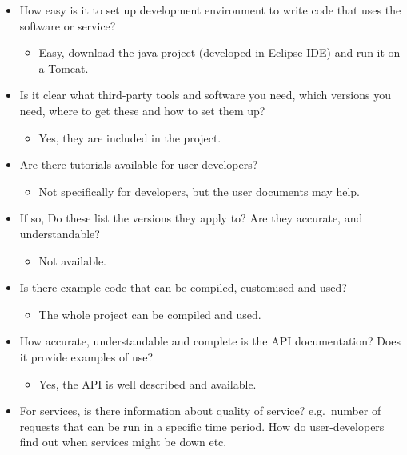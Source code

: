 \begin{itemize}
\itemsep1pt\parskip0pt
\item
  How easy is it to set up development environment to write code that
  uses the software or service?

  \begin{itemize}
  \itemsep1pt\parskip0pt
  \item
    Easy, download the java project (developed in Eclipse IDE) and run
    it on a Tomcat.
  \end{itemize}
\item
  Is it clear what third-party tools and software you need, which
  versions you need, where to get these and how to set them up?

  \begin{itemize}
  \itemsep1pt\parskip0pt
  \item
    Yes, they are included in the project.
  \end{itemize}
\item
  Are there tutorials available for user-developers?

  \begin{itemize}
  \itemsep1pt\parskip0pt
  \item
    Not specifically for developers, but the user documents may help.
  \end{itemize}
\item
  If so, Do these list the versions they apply to? Are they accurate,
  and understandable?

  \begin{itemize}
  \itemsep1pt\parskip0pt
  \item
    Not available.
  \end{itemize}
\item
  Is there example code that can be compiled, customised and used?

  \begin{itemize}
  \itemsep1pt\parskip0pt
  \item
    The whole project can be compiled and used.
  \end{itemize}
\item
  How accurate, understandable and complete is the API documentation?
  Does it provide examples of use?

  \begin{itemize}
  \itemsep1pt\parskip0pt
  \item
    Yes, the API is well described and available.
  \end{itemize}
\item
  For services, is there information about quality of service?
  e.g.~number of requests that can be run in a specific time period. How
  do user-developers find out when services might be down etc.


\end{itemize}
